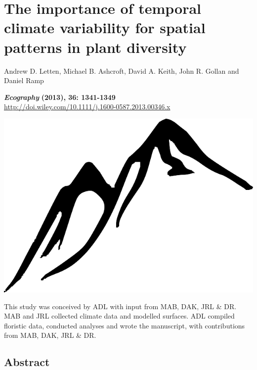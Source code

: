 \chapter{The importance of temporal climate variability for spatial patterns in plant diversity}

\graphicspath{{Chapter2/Figs/}}

\begin{center}

{\large Andrew D. Letten, Michael B. Ashcroft, David A. Keith, John R. Gollan and Daniel Ramp}

\small\textit{\textbf{Ecography}} \textbf{(2013), 36: 1341-1349}\\
\url{http://doi.wiley.com/10.1111/j.1600-0587.2013.00346.x}

\vspace{1in}
\includegraphics[width=0.15\linewidth]{Chapter2/Figs/mountain}

\vfill
This study was conceived by ADL with input from MAB, DAK, JRL \& DR. MAB and JRL collected climate data and modelled surfaces. ADL compiled floristic data, conducted analyses and wrote the manuscript, with contributions from MAB, DAK, JRL \& DR. 

\end{center}

\newpage
\section{Abstract}

